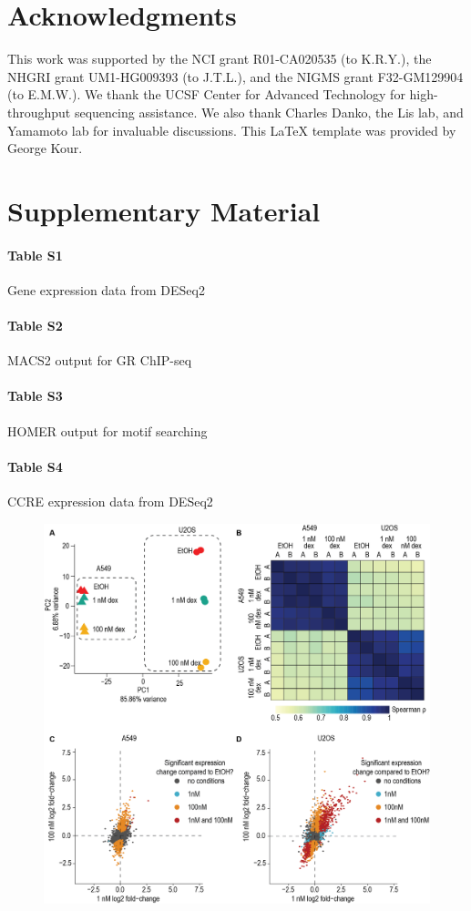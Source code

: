 \documentclass{article}
\begin{document}
{\section*{Acknowledgments}
This work was supported by the NCI grant R01-CA020535 (to K.R.Y.), the NHGRI grant UM1-HG009393 (to J.T.L.), and the NIGMS grant F32-GM129904 (to E.M.W.). We thank the UCSF Center for Advanced Technology for high-throughput sequencing assistance. We also thank Charles Danko, the Lis lab, and Yamamoto lab for invaluable discussions. This LaTeX template was provided by George Kour. 

\printbibliography

\section*{Supplementary Material}
\paragraph{Table S1} Gene expression data from DESeq2
\paragraph{Table S2} MACS2 output for GR ChIP-seq
\paragraph{Table S3} HOMER output for motif searching
\paragraph{Table S4} CCRE expression data from DESeq2

\clearpage

\begin{figure}[ht!]
\includegraphics[width=\textwidth]{figures/FigureS1_2021-04.png}
\label{fig:figS1}
\end{figure}
}
\end{document}
